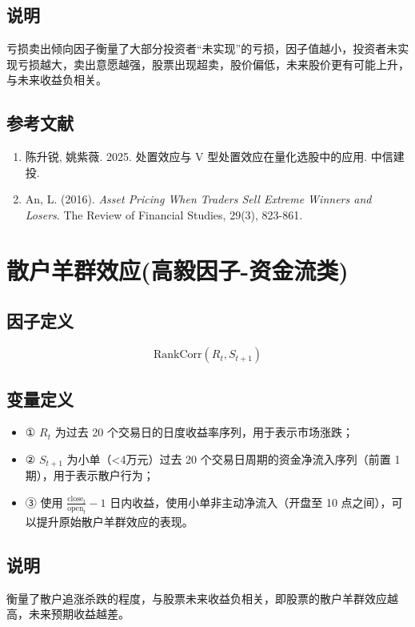 \documentclass{article}
\begin{document}
\subsection{说明}
亏损卖出倾向因子衡量了大部分投资者“未实现”的亏损，因子值越小，投资者未实现亏损越大，卖出意愿越强，股票出现超卖，股价偏低，未来股价更有可能上升，与未来收益负相关。

\subsection{参考文献}
\begin{enumerate}
    \item 陈升锐, 姚紫薇. 2025. 处置效应与 V 型处置效应在量化选股中的应用. 中信建投.
    \item An, L. (2016). \textit{Asset Pricing When Traders Sell Extreme Winners and Losers}. The Review of Financial Studies, 29(3), 823-861.
\end{enumerate}

\section{散户羊群效应(高毅因子-资金流类)}

\subsection{因子定义}
\begin{equation}
    \mathrm{RankCorr}(R_t, S_{t+1})
\end{equation}

\subsection{变量定义}
\begin{itemize}
    \item ① \(R_t\) 为过去 20 个交易日的日度收益率序列，用于表示市场涨跌；
    \item ② \(S_{t+1}\) 为小单（<4万元）过去 20 个交易日周期的资金净流入序列（前置 1 期），用于表示散户行为；
    \item ③ 使用 \(\frac{\mathrm{close}_t}{\mathrm{open}_t} - 1\) 日内收益，使用小单非主动净流入（开盘至 10 点之间），可以提升原始散户羊群效应的表现。
\end{itemize}

\subsection{说明}
衡量了散户追涨杀跌的程度，与股票未来收益负相关，即股票的散户羊群效应越高，未来预期收益越差。
\end{document}
